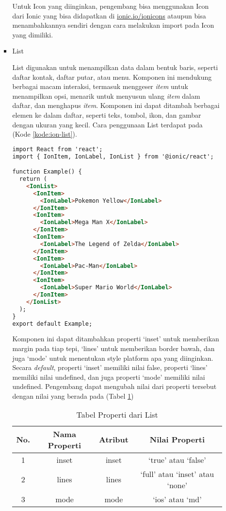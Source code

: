 \documentclass[a4paper,twoside]{article}
\begin{document}
\begin{enumerate}
\begin{itemize}
\begin{itemize}
Untuk Icon yang diinginkan, pengembang bisa menggunakan Icon dari Ionic yang bisa didapatkan di \url{ionic.io/ionicons} ataupun bisa menambahkannya sendiri dengan cara melakukan import pada Icon yang dimiliki.

    \item List

    List digunakan untuk menampilkan data dalam bentuk baris, seperti daftar kontak, daftar putar, atau menu. Komponen ini mendukung berbagai macam interaksi, termasuk menggeser \textit{item} untuk menampilkan opsi, menarik untuk menyusun ulang \textit{item} dalam daftar, dan menghapus \textit{item}. Komponen ini dapat ditambah berbagai elemen ke dalam daftar, seperti teks, tombol, ikon, dan gambar dengan ukuran yang kecil. Cara penggunaan List terdapat pada (Kode \ref{kode:ion-list}).

\begin{lstlisting}[language=HTML, caption=Contoh Kode Penggunaan List, label=kode:ion-list]
import React from 'react';
import { IonItem, IonLabel, IonList } from '@ionic/react';

function Example() {
  return (
    <IonList>
      <IonItem>
        <IonLabel>Pokemon Yellow</IonLabel>
      </IonItem>
      <IonItem>
        <IonLabel>Mega Man X</IonLabel>
      </IonItem>
      <IonItem>
        <IonLabel>The Legend of Zelda</IonLabel>
      </IonItem>
      <IonItem>
        <IonLabel>Pac-Man</IonLabel>
      </IonItem>
      <IonItem>
        <IonLabel>Super Mario World</IonLabel>
      </IonItem>
    </IonList>
  );
}
export default Example;
\end{lstlisting}

Komponen ini dapat ditambahkan properti `inset' untuk memberikan margin pada tiap tepi, `lines' untuk memberikan border bawah, dan juga `mode' untuk menentukan style platform apa yang diinginkan. Secara \textit{default}, properti `inset' memiliki nilai false, properti `lines' memiliki nilai undefined, dan juga properti `mode' memiliki nilai undefined. Pengembang dapat mengubah nilai dari properti tersebut dengan nilai yang berada pada (Tabel \ref{tab:list-property})

\begin{table} [H]
    \centering
    \caption{Tabel Properti dari List}
    \begin{tabular}{|c|c|c|c|}
    \hline
       No. & Nama Properti & Atribut & Nilai Properti \\ \hline
        1 & inset & inset & `true' atau `false'\\ \hline
        2 & lines & lines & `full' atau `inset' atau `none'\\ \hline
        3 & mode & mode & `ios' atau `md' \\ \hline
    \end{tabular}
    \label{tab:list-property}
\end{table}


\end{itemize}
\end{itemize}
\end{enumerate}
\end{document}
